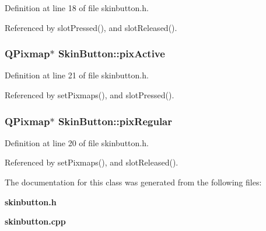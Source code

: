 Definition at line 18 of file skinbutton.h.

Referenced by slot\-Pressed(), and slot\-Released().
\subsubsection{\setlength{\rightskip}{0pt plus 5cm}QPixmap$\ast$ {\bf Skin\-Button::pix\-Active}\hspace{0.3cm}{\tt  [protected]}}\label{classSkinButton_SkinButtonp1}




Definition at line 21 of file skinbutton.h.

Referenced by set\-Pixmaps(), and slot\-Pressed().
\subsubsection{\setlength{\rightskip}{0pt plus 5cm}QPixmap$\ast$ {\bf Skin\-Button::pix\-Regular}\hspace{0.3cm}{\tt  [protected]}}\label{classSkinButton_SkinButtonp0}




Definition at line 20 of file skinbutton.h.

Referenced by set\-Pixmaps(), and slot\-Released().

The documentation for this class was generated from the following files:\begin{CompactItemize}
\item 
{\bf skinbutton.h}\item 
{\bf skinbutton.cpp}\end{CompactItemize}
